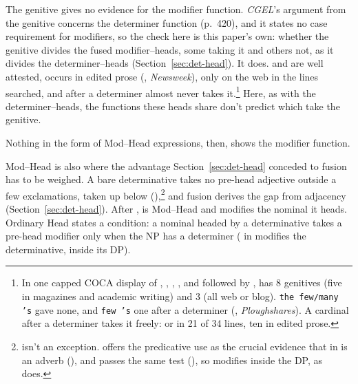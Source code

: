 The genitive gives no evidence for the modifier function. \textit{CGEL}'s argument from the genitive concerns the determiner function (p.~420), and it states no case requirement for modifiers, so the check here is this paper's own: whether the genitive divides the fused modifier--heads, some taking it and others not, as it divides the determiner--heads (Section~\ref{sec:det-head}). It does.  and  are well attested,  occurs in edited prose (, \textit{Newsweek}),  only on the web in the lines searched, and  after a determiner almost never takes it.\footnote{In one capped COCA display of , , , , and  followed by ,  has 8 genitives (five in magazines and academic writing) and  3 (all web or blog). \texttt{the few/many 's} gave none, and \texttt{few 's} one after a determiner (, \textit{Ploughshares}). A cardinal after a determiner takes it freely:  or  in 21 of 34 lines, ten in edited prose.} Here, as with the determiner--heads, the functions these heads share don't predict which take the genitive.

Nothing in the form of Mod--Head expressions, then, shows the modifier function.

Mod--Head is also where the advantage Section~\ref{sec:det-head} conceded to fusion has to be weighed. A bare determinative takes no pre-head adjective outside a few exclamations, taken up below (),\footnote{ isn't an exception. \textcite[102]{matthews2014} offers the predicative use as the crucial evidence that  in  is an adverb (), and  passes the same test (), so  modifies  inside the DP, as  does.} and fusion derives the gap from adjacency (Section~\ref{sec:det-head}). After ,  is Mod--Head and  modifies the nominal it heads. Ordinary Head states a condition: a nominal headed by a determinative takes a pre-head modifier only when the NP has a determiner ( in  modifies the determinative, inside its DP).

